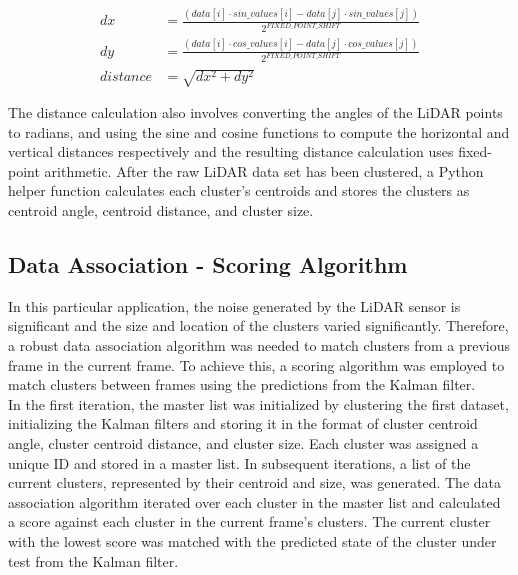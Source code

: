 \documentclass[journal]{IEEEtran} %
\begin{document}
\begin{align*}
dx &= \frac{(data[i] \cdot sin\_values[i] - data[j] \cdot sin\_values[j])}{2^{FIXED\_POINT\_SHIFT}}\\
dy &= \frac{(data[i] \cdot cos\_values[i] - data[j] \cdot cos\_values[j])}{2^{FIXED\_POINT\_SHIFT}}\\
distance &= \sqrt{dx^2 + dy^2}
\end{align*}


The distance calculation also involves converting the angles of the LiDAR points to radians, and using the sine and cosine functions to compute the horizontal and vertical distances respectively and the resulting distance calculation uses fixed-point arithmetic. After the raw LiDAR data set has been clustered, a Python helper function calculates each cluster's centroids and stores the clusters as centroid angle, centroid distance, and cluster size. 

\subsection{Data Association - Scoring Algorithm}

In this particular application, the noise generated by the LiDAR sensor is significant and the size and location of the clusters varied significantly. Therefore, a robust data association algorithm was needed to match clusters from a previous frame in the current frame. To achieve this, a scoring algorithm was employed to match clusters between frames using the predictions from the Kalman filter.\\

In the first iteration, the master list was initialized by clustering the first dataset, initializing the Kalman filters and storing it in the format of cluster centroid angle, cluster centroid distance, and cluster size. Each cluster was assigned a unique ID and stored in a master list. In subsequent iterations, a list of the current clusters, represented by their centroid and size, was generated. The data association algorithm iterated over each cluster in the master list and calculated a score against each cluster in the current frame's clusters. The current cluster with the lowest score was matched with the predicted state of the cluster under test from the Kalman filter.\\
\end{document}
